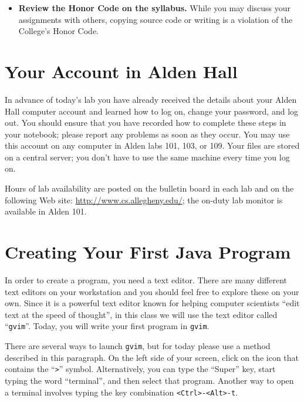 \documentclass[11pt]{article}
\begin{document}
\begin{itemize}
\item {\bf Review the Honor Code on the syllabus.} While you may discuss your assignments with others, copying source
  code or writing is a violation of the College's Honor Code.

\end{itemize}

\section*{Your Account in Alden Hall}

In advance of today's lab you have already received the details about your Alden Hall computer account and learned how
to log on, change your password, and log out.  You should ensure that you have recorded how to complete these steps in
your notebook; please report any problems as soon as they occur. You may use this account on any computer in Alden labs
101, 103, or 109. Your files are stored on a central server; you don't have to use the same machine every time you log
on.

Hours of lab availability are posted on the bulletin board in each lab and on the following Web site:
\url{http://www.cs.allegheny.edu/}; the on-duty lab monitor is available in Alden 101.

\section*{Creating Your First Java Program}

In order to create a program, you need a text editor. There are many different text editors on your workstation and
you should feel free to explore these on your own. Since it is a powerful text editor known for helping computer
scientists ``edit text at the speed of thought'', in this class we will use the text editor called ``{\tt gvim}''.
Today, you will write your first program in {\tt gvim}.

There are several ways to launch {\tt gvim}, but for today please use a method described in this paragraph.  On the
left side of your screen, click on the icon that contains the ``{\tt >}'' symbol.  Alternatively, you can type the
``Super'' key, start typing the word ``terminal'', and then select that program.  Another way to open a terminal
involves typing the key combination {\tt <Ctrl>-<Alt>-t}.

\end{document}
